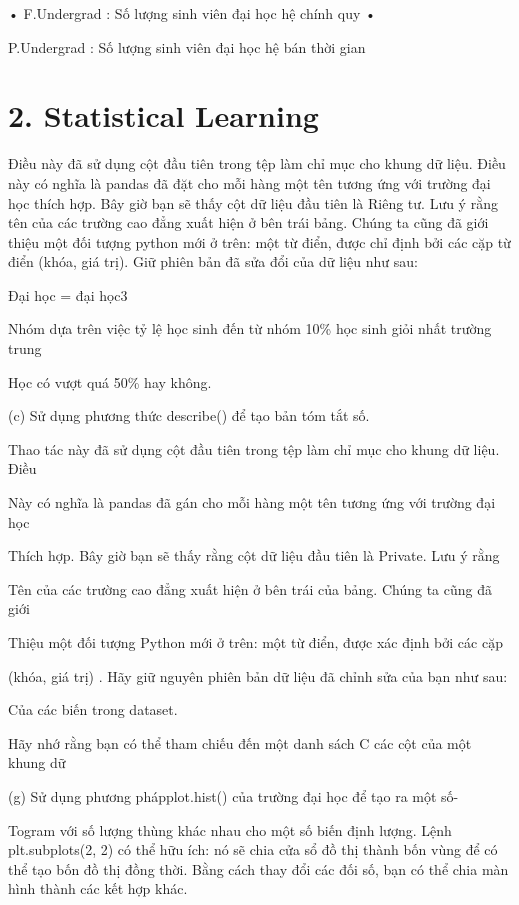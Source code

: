 • F.Undergrad : Số lượng sinh viên đại học hệ chính quy •

P.Undergrad : Số lượng sinh viên đại học hệ bán thời gian

\section{2. Statistical Learning}

Điều này đã sử dụng cột đầu tiên trong tệp làm chỉ mục cho khung dữ liệu. Điều này có nghĩa là pandas đã đặt cho mỗi hàng một tên tương ứng với trường đại học thích hợp. Bây giờ bạn sẽ thấy cột dữ liệu đầu tiên là Riêng tư. Lưu ý rằng tên của các trường cao đẳng xuất hiện ở bên trái bảng. Chúng ta cũng đã giới thiệu một đối tượng python mới ở trên: một từ điển, được chỉ định bởi các cặp từ điển (khóa, giá trị). Giữ phiên bản đã sửa đổi của dữ liệu như sau:

Đại học = đại học3

Nhóm dựa trên việc tỷ lệ học sinh đến từ nhóm 10\% học sinh giỏi nhất trường trung

Học có vượt quá 50\% hay không.

(c) Sử dụng phương thức describe() để tạo bản tóm tắt số.

Thao tác này đã sử dụng cột đầu tiên trong tệp làm chỉ mục cho khung dữ liệu. Điều

Này có nghĩa là pandas đã gán cho mỗi hàng một tên tương ứng với trường đại học

Thích hợp. Bây giờ bạn sẽ thấy rằng cột dữ liệu đầu tiên là Private. Lưu ý rằng

Tên của các trường cao đẳng xuất hiện ở bên trái của bảng. Chúng ta cũng đã giới

Thiệu một đối tượng Python mới ở trên: một từ điển, được xác định bởi các cặp

(khóa, giá trị) . Hãy giữ nguyên phiên bản dữ liệu đã chỉnh sửa của bạn như sau:

Của các biến trong dataset.

Hãy nhớ rằng bạn có thể tham chiếu đến một danh sách C các cột của một khung dữ

(g) Sử dụng phương phápplot.hist() của trường đại học để tạo ra một số-

Togram với số lượng thùng khác nhau cho một số biến định lượng. Lệnh plt.subplots(2, 2) có thể hữu ích: nó sẽ chia cửa sổ đồ thị thành bốn vùng để có thể tạo bốn đồ thị đồng thời. Bằng cách thay đổi các đối số, bạn có thể chia màn hình thành các kết hợp khác.

